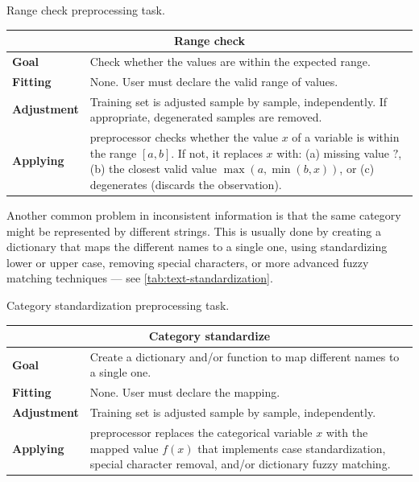 \begin{tablebox}[label=tab:range-check]{Range check preprocessing task.}
  \centering
  \begin{tabular}{lp{6cm}}
    \toprule
    \multicolumn{2}{c}{\textbf{Range check}} \\
    \midrule
    \textbf{Goal} &
      Check whether the values are within the expected range. \\
    \textbf{Fitting} &
      None. User must declare the valid range of values. \\
    \textbf{Adjustment} &
      Training set is adjusted sample by sample, independently.  If appropriate,
      degenerated samples are removed. \\
    \textbf{Applying} &
      \Gls{preprocessor} checks whether the value $x$ of a variable is within the range $[a,
      b]$.  If not, it replaces $x$ with: (a) missing value $?$, (b) the closest valid
      value $\max(a, \min(b, x))$, or (c) degenerates (discards the observation). \\
    \bottomrule
  \end{tabular}
\end{tablebox}

Another common problem in inconsistent information is that the same category might be
represented by different strings.  This is usually done by creating a dictionary that maps
the different names to a single one, using standardizing lower or upper case, removing
special characters, or more advanced fuzzy matching techniques --- see
\cref{tab:text-standardization}.

\begin{tablebox}[label=tab:text-standardization]{Category standardization preprocessing task.}
  \centering
  \begin{tabular}{lp{6cm}}
    \toprule
    \multicolumn{2}{c}{\textbf{Category standardize}} \\
    \midrule
    \textbf{Goal} &
      Create a dictionary and/or function to map different names to a single one. \\
    \textbf{Fitting} &
      None. User must declare the mapping. \\
    \textbf{Adjustment} &
      Training set is adjusted sample by sample, independently. \\
    \textbf{Applying} &
      \Gls{preprocessor} replaces the categorical variable $x$ with the mapped
      value $f(x)$ that implements case standardization, special character removal, and/or
      dictionary fuzzy matching. \\
    \bottomrule
  \end{tabular}
\end{tablebox}

